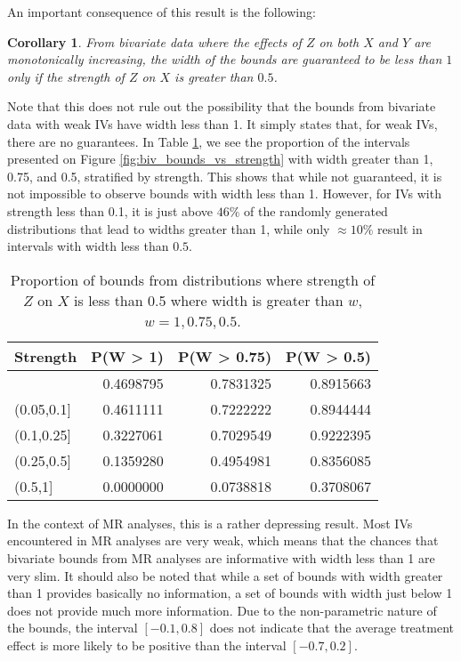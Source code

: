 \documentclass[
]{article}
\theoremstyle{plain}
\newtheorem{corollary}[theorem]{Corollary}
\begin{document}
An important consequence of this result is the following:

\begin{corollary}
From bivariate data where the effects of $Z$ on both $X$ and $Y$ are monotonically increasing, the width of the bounds are guaranteed to be less than $1$ only if the strength of $Z$ on $X$ is greater than $0.5$.
\end{corollary}

Note that this does not rule out the possibility that the bounds from bivariate data with weak IVs have width less than 1. It simply states that, for weak IVs, there are no guarantees. In Table \ref{tab:prop_of_biv_widths_large}, we see the proportion of the intervals presented on Figure \ref{fig:biv_bounds_vs_strength} with width greater than 1, 0.75, and 0.5, stratified by strength. This shows that while not guaranteed, it is not impossible to observe bounds with width less than 1. However, for IVs with strength less than 0.1, it is just above \(46\%\) of the randomly generated distributions that lead to widths greater than 1, while only \(\approx 10\%\) result in intervals with width less than \(0.5\).

\begin{table}[!h]
  \begin{center}
  
\begin{tabular}{l|r|r|r}
\hline
Strength & P(W > 1) & P(W > 0.75) & P(W > 0.5)\\
\hline
[0,0.05] & 0.4698795 & 0.7831325 & 0.8915663\\
\hline
(0.05,0.1] & 0.4611111 & 0.7222222 & 0.8944444\\
\hline
(0.1,0.25] & 0.3227061 & 0.7029549 & 0.9222395\\
\hline
(0.25,0.5] & 0.1359280 & 0.4954981 & 0.8356085\\
\hline
(0.5,1] & 0.0000000 & 0.0738818 & 0.3708067\\
\hline
\end{tabular}


  \caption{Proportion of bounds from distributions where strength of $Z$ on $X$ is less than 0.5 where width is greater than $w$, $w=1,0.75,0.5$.}
  \label{tab:prop_of_biv_widths_large}
  \end{center}
\end{table}

In the context of MR analyses, this is a rather depressing result. Most IVs encountered in MR analyses are very weak, which means that the chances that bivariate bounds from MR analyses are informative with width less than 1 are very slim. It should also be noted that while a set of bounds with width greater than 1 provides basically no information, a set of bounds with width just below 1 does not provide much more information. Due to the non-parametric nature of the bounds, the interval \([-0.1, 0.8]\) does not indicate that the average treatment effect is more likely to be positive than the interval \([-0.7, 0.2]\).
\end{document}
